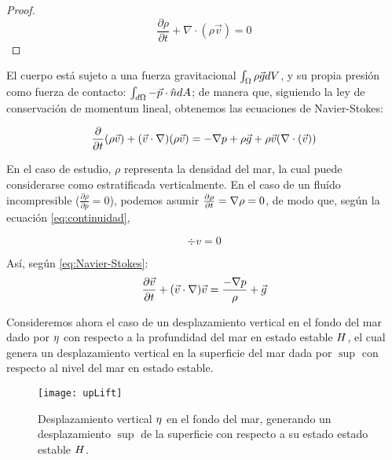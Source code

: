 \message{ !name(Tsunamis.tex)}\documentclass[TesisTotal.tex]{subfiles}
\begin{document}
\begin{proof}
\[
  \frac{ \partial \rho}{\partial t} + \nabla \cdot (\rho \vec{v}) = 0
\]
\end{proof}

El cuerpo está sujeto a una fuerza gravitacional $\int_{\Omega} \rho \vec{g} dV$, y su propia presión como fuerza de contacto: $\int_{d\Omega} -\vec{p} \cdot \hat{n} dA$; de manera que, siguiendo la ley de conservación de momentum lineal, obtenemos las ecuaciones de Navier-Stokes: 

\begin{equation}
  \label{eq:Navier-Stokes}
  \frac{\partial }{\partial t} (\rho \vec{v}) +(\vec{v}\cdot\nabla)(\rho\vec{v}) = -\nabla p + \rho \vec{g} + \rho \vec{v} (\nabla \cdot \left( \vec{v} \right))
\end{equation}

En el caso de estudio, $\rho$ representa la densidad del mar, la cual puede considerarse como estratificada verticalmente.
En el caso de un fluído incompresible ($\frac{\partial \rho}{\partial p}=0$), podemos asumir $\frac{\partial \rho}{\partial t} = \nabla \rho =  0$, de modo que, según la ecuación \eqref{eq:continuidad},

\begin{equation}
  \label{eq:divV}
  \div{v}=0  
\end{equation}


Así, según \eqref{eq:Navier-Stokes}:
\begin{equation}
  \label{eq:Navier-Stokes2}
  \frac{\partial \vec{v}}{\partial t} + (\vec{v}\cdot\nabla)\vec{v} = \frac{-\nabla p}{\rho} + \vec{g}
\end{equation}

Consideremos ahora el caso de un desplazamiento vertical en el fondo del mar dado por $\eta$ con respecto a la profundidad del mar en estado estable $H$, el cual genera un desplazamiento vertical en la superficie del mar dada por $\sup$ con respecto al nivel del mar en estado estable.

\begin{figure}
  \centering
  \texttt{[image: upLift]}
  \caption{Desplazamiento vertical $\eta$ en el fondo del mar, generando un desplazamiento $\sup$ de la superficie con respecto a su estado estado estable $H$.}
  \label{fig:upLift}
\end{figure}
\end{document}
